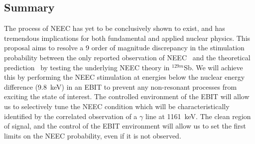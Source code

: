 \documentclass[12pt]{article}
\begin{document}
\begin{comment}
\subsection{\label{GSI}Note of Complimentary Efforts at the GSI-CRYRING}
We also note here that the GSI-CRYRING collaboration has interest in such a measurement as well.  In fact, the case of $^{129}$Sb was first identified by this group as part of an effort to initiate a more focused NEEC-program at the CRYRING~\cite{Let16}. Since the experimental methods of production, separation, storage, and NEEC stimulation are dramatically different than what we propose here, this effort would be highly complementary and will serve as an independent confirmation of our measurement or limit.  This CRYRING proposal has not yet been submitted to the GSI PAC, but is in preparation.  Even with the promising CRYRING work on the horizon, we see several advantages to our experimental method that we note here.  First, the low-energy environment of the ion trap significantly limits energetic non-resonant processes from exciting the nuclear state outside of NEEC.  Second, the deceleration processes in both storage rings leads to an increased loss of highly-charged ions due to recombination processes, making the NEEC conditions more difficult to satisfy, and for the NEEC events that are generated during implantation, the immediate neutralization of the ions will generate large rates of $\gamma$- and X-rays from non-NEEC decays, making a signal difficult to observe.
\end{comment}

\subsection{Summary}
The process of NEEC has yet to be conclusively shown to exist, and has tremendous implications for both fundamental and applied nuclear physics.  This proposal aims to resolve a 9 order of magnitude discrepancy in the stimulation probability between the only reported observation of NEEC~\cite{Chi18} and the theoretical prediction~\cite{PalPC} by testing the underlying NEEC theory in $^{129m}$Sb.  We will achieve this by performing the NEEC stimulation at energies below the nuclear energy difference (9.8~keV) in an EBIT to prevent any non-resonant processes from exciting the state of interest.  The controlled environment of the EBIT will allow us to selectively tune the NEEC condition which will be characteristically identified by the correlated observation of a $\gamma$ line at 1161~keV.  The clean region of signal, and the control of the EBIT environment will allow us to set the first limits on the NEEC probability, even if it is not observed.
\end{document}

